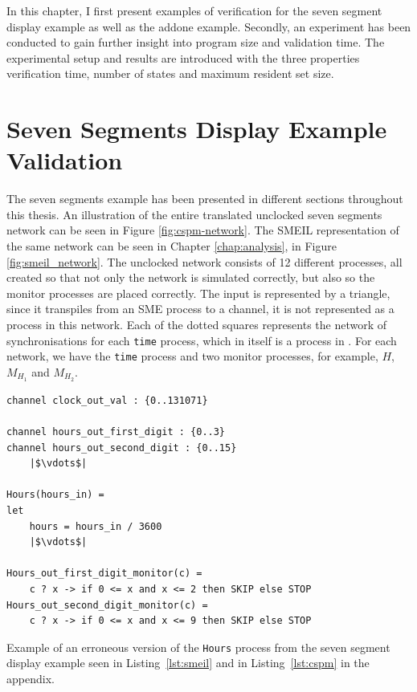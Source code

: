 
In this chapter, I first present examples of verification for the seven segment display example as well as the addone example. Secondly, an experiment has been conducted to gain further insight into program size and validation time. The experimental setup and results are introduced with the three properties verification time, number of states and maximum resident set size.

\section{Seven Segments Display Example Validation}
The seven segments example has been presented in different sections throughout this thesis. An illustration of the entire translated unclocked seven segments network can be seen in Figure \ref{fig:cspm-network}. The SMEIL representation of the same network can be seen in Chapter \ref{chap:analysis}, in Figure \ref{fig:smeil_network}.
The unclocked \cspm{} network consists of 12 different processes, all created so that not only the network is simulated correctly, but also so the monitor processes are placed correctly. The input is represented by a triangle, since it transpiles from an SME process to a \cspm{} channel, it is not represented as a process in this network. Each of the dotted squares represents the network of synchronisations for each \texttt{time} process, which in itself is a process in \cspm{}. For each network, we have the \texttt{time} process and two monitor processes, for example, $H$, $M_{H_1}$ and $M_{H_2}$.
\\

\begin{listing}
\begin{verbatim}
channel clock_out_val : {0..131071}

channel hours_out_first_digit : {0..3}
channel hours_out_second_digit : {0..15}
    |$\vdots$|

Hours(hours_in) =
let
    hours = hours_in / 3600
    |$\vdots$|

Hours_out_first_digit_monitor(c) =
    c ? x -> if 0 <= x and x <= 2 then SKIP else STOP
Hours_out_second_digit_monitor(c) =
    c ? x -> if 0 <= x and x <= 9 then SKIP else STOP

\end{verbatim}
\caption{Example of an erroneous version of the \texttt{Hours} process from the \cspm{} seven segment display example seen in Listing~\ref{lst:smeil} and in Listing~\ref{lst:cspm} in the appendix.}
\label{lst:cspm_error}
\end{listing}

